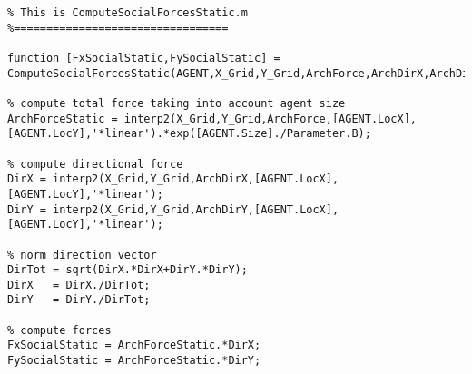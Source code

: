 
\lstset{basicstyle=\footnotesize\ttfamily}
    
    \begin{lstlisting}[breaklines]
%=================================
% This is ComputeSocialForcesStatic.m
%=================================       
    
function [FxSocialStatic,FySocialStatic] = ComputeSocialForcesStatic(AGENT,X_Grid,Y_Grid,ArchForce,ArchDirX,ArchDirY,Parameter)

% compute total force taking into account agent size
ArchForceStatic = interp2(X_Grid,Y_Grid,ArchForce,[AGENT.LocX],[AGENT.LocY],'*linear').*exp([AGENT.Size]./Parameter.B);

% compute directional force
DirX = interp2(X_Grid,Y_Grid,ArchDirX,[AGENT.LocX],[AGENT.LocY],'*linear');
DirY = interp2(X_Grid,Y_Grid,ArchDirY,[AGENT.LocX],[AGENT.LocY],'*linear');

% norm direction vector
DirTot = sqrt(DirX.*DirX+DirY.*DirY);
DirX   = DirX./DirTot;
DirY   = DirY./DirTot;

% compute forces
FxSocialStatic = ArchForceStatic.*DirX;
FySocialStatic = ArchForceStatic.*DirY;
\end{lstlisting}
